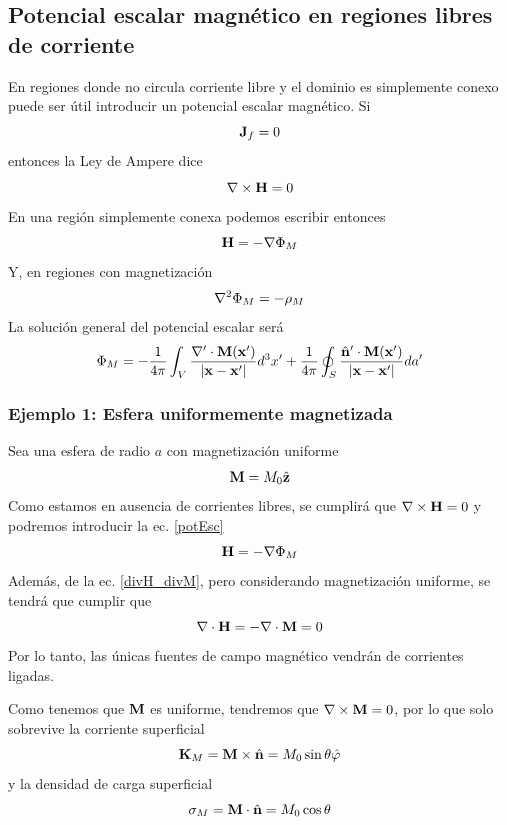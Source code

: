 \documentclass[]{article}
\numberwithin{equation}{section}
\begin{document}
\subsection{Potencial escalar magnético en regiones libres de corriente}
En regiones donde no circula corriente libre y el dominio es simplemente conexo puede ser útil introducir un potencial escalar magnético. Si
\begin{equation*}
	\mathbf{J}_{f} = 0
\end{equation*}
entonces la Ley de Ampere dice
\begin{equation*}
	\nabla\times\mathbf{H} = 0
\end{equation*}
En una región simplemente conexa podemos escribir entonces
\begin{equation}
	\mathbf{H} = -\nabla\Phi_{M}\label{potEsc}
\end{equation}
Y, en regiones con magnetización
\begin{equation}
	\nabla^2\Phi_{M} = -\rho_{M}
\end{equation}
La solución general del potencial escalar será
\begin{equation}
	\Phi_{M} = - \frac{1}{4\pi} \int_{V} \frac{\nabla' \cdot \mathbf{M}(\mathbf{x}')}{|\mathbf{x} - \mathbf{x}'|}d^3 x' + \frac{1}{4\pi}\oint_{S}\frac{\hat{\mathbf{n}}' \cdot \mathbf{M}(\mathbf{x}')}{|\mathbf{x} - \mathbf{x}'|} da' \label{PhiM_sol}
\end{equation}

\subsubsection{Ejemplo 1: Esfera uniformemente magnetizada}
Sea una esfera de radio \(a\) con magnetización uniforme
\begin{equation*}
	\mathbf{M} = M_0 \hat{\mathbf{z}}
\end{equation*}
Como estamos en ausencia de corrientes libres, se cumplirá que \(\nabla\times\mathbf{H} = 0\) y podremos introducir la ec. \ref{potEsc}
\begin{equation*}
	\mathbf{H} = -\nabla\Phi_{M}
\end{equation*}
Además, de la ec. \ref{divH_divM}, pero considerando magnetización uniforme, se tendrá que cumplir que
\begin{equation}
	\nabla\cdot\mathbf{H} = - \nabla\cdot\mathbf{M} = 0
\end{equation}
Por lo tanto, las únicas fuentes de campo magnético vendrán de corrientes ligadas.

Como tenemos que \(\mathbf{M}\) es uniforme, tendremos que \(\nabla\times\mathbf{M} = 0\), por lo que solo sobrevive la corriente superficial 
\begin{equation}
	\mathbf{K}_{M} = \mathbf{M}\times\hat{\mathbf{n}} = M_{0} \sin\theta \hat{\mathbf{\varphi}}
\end{equation}
y la densidad de carga superficial
\begin{equation}
	\sigma_{M} = \mathbf{M}\cdot\hat{\mathbf{n}} = M_{0} \cos\theta
\end{equation}
\end{document}
